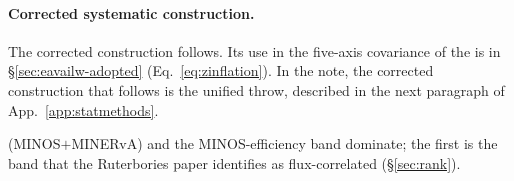 \paragraph{Corrected systematic construction.} The corrected construction follows. Its use in the five-axis covariance of the \resFiveAxis{} is in \S\ref{sec:eavailw-adopted} (Eq.~\eqref{eq:zinflation}). In the note, the corrected construction that follows is the unified throw, described in the next paragraph of App.~\ref{app:statmethods}.\par (MINOS$+$MINERvA) and the MINOS-efficiency band dominate; the first is the band that the Ruterbories paper identifies as flux-correlated (\S\ref{sec:rank}).


